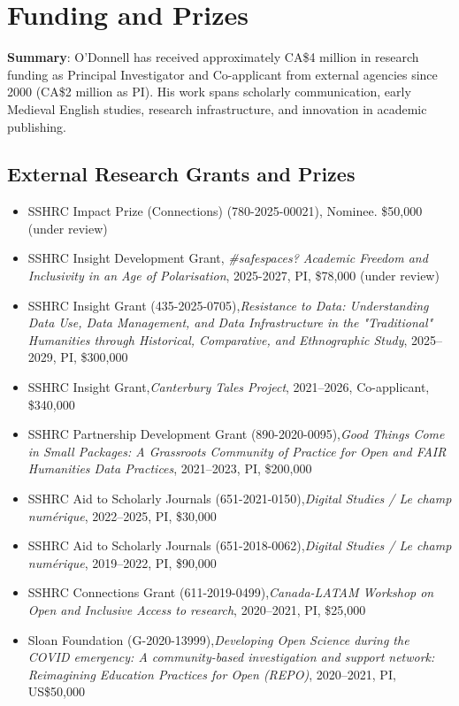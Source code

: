 \documentclass[12pt]{article}
\begin{document}
\section*{Funding and Prizes}

\textbf{Summary}: O'Donnell has received approximately CA\$4 million in research funding as Principal Investigator and Co-applicant from external agencies since 2000 (CA\$2 million as PI). His work spans scholarly communication, early Medieval English studies, research infrastructure, and innovation in academic publishing.


\subsection*{External Research Grants and Prizes}

\begin{itemize}
  \item SSHRC Impact Prize (Connections) (780-2025-00021), Nominee. \$50,000 (under review)
  \item SSHRC Insight Development Grant, \textit{\#safespaces? Academic Freedom and Inclusivity in an Age of Polarisation}, 2025-2027, PI, \$78,000 (under review)
  \item SSHRC Insight Grant (435-2025-0705),\textit{Resistance to Data: Understanding Data Use, Data Management, and Data Infrastructure in the "Traditional" Humanities through Historical, Comparative, and Ethnographic Study}, 2025–2029, PI, \$300,000
  \item SSHRC Insight Grant,\textit{Canterbury Tales Project}, 2021–2026, Co-applicant, \$340,000
  \item SSHRC Partnership Development Grant (890-2020-0095),\textit{Good Things Come in Small Packages: A Grassroots Community of Practice for Open and FAIR Humanities Data Practices}, 2021–2023, PI, \$200,000
  \item SSHRC Aid to Scholarly Journals (651-2021-0150),\textit{Digital Studies / Le champ numérique}, 2022–2025, PI, \$30,000
  \item SSHRC Aid to Scholarly Journals (651-2018-0062),\textit{Digital Studies / Le champ numérique}, 2019–2022, PI, \$90,000
  \item SSHRC Connections Grant (611-2019-0499),\textit{Canada-LATAM Workshop on Open and Inclusive Access to research}, 2020–2021, PI, \$25,000
  \item Sloan Foundation (G-2020-13999),\textit{Developing Open Science during the COVID emergency: A community-based investigation and support network: Reimagining Education Practices for Open (REPO)}, 2020–2021, PI, US\$50,000

\end{itemize}
\end{document}
